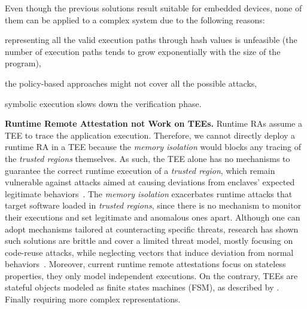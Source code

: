 Even though the previous solutions result suitable for embedded devices, none 
of them can be applied to a complex system due to the following reasons: 
\begin{enumerate*}[label=(\roman*)]
	\item representing all the valid execution paths through hash values is 
	unfeasible (\eg the number of execution paths tends to grow exponentially 
	with the size of the program),
	\item the policy-based approaches might not cover all the possible attacks,
	\item symbolic execution slows down the verification phase.
\end{enumerate*}

\vspace{0.5cm}
\noindent \textbf{Runtime Remote Attestation not Work on TEEs.}
Runtime RAs assume a TEE to trace the application execution.
Therefore, we cannot directly deploy a runtime RA in a TEE because the 
\emph{memory isolation} would blocks any tracing of the \emph{trusted regions} 
themselves.
As such, the TEE alone has no mechanisms to guarantee the correct runtime 
execution of a \emph{trusted region}, which remain vulnerable against
attacks aimed at causing deviations from enclaves' expected legitimate
behaviors~\citep{tale-two-worlds,251582,biondo2018guard,lee2017hacking,snakegx}.
The \emph{memory isolation} exacerbates runtime attacks that target 
software loaded in \emph{trusted regions}, since there is no mechanism to 
monitor their executions and set legitimate and anomalous ones apart.
Although one can adopt mechanisms tailored at counteracting 
specific threats, research has shown such solutions are brittle and cover a 
limited threat model, mostly focusing on code-reuse attacks, while neglecting 
vectors that induce deviation from normal
behaviors~\citep{tale-two-worlds,251582,biondo2018guard,lee2017hacking}.
Moreover, current runtime remote attestations focus on
stateless properties, \ie they only model independent executions.  On
the contrary, TEEs are stateful objects modeled as finite states
machines (FSM), as described by \cite{costan2016intel}.
Finally requiring more complex representations.
%

